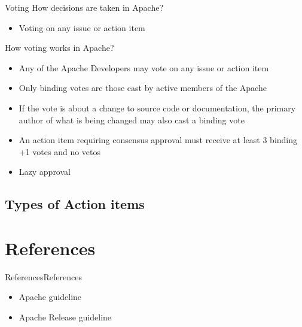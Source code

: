 \documentclass[10pt]{beamer}
\begin{document}
\begin{frame}{Voting}
  How decisions are taken in Apache? \pause
  \begin{itemize}
    \item Voting on any issue or action item
  \end{itemize}

  How voting works in Apache? \pause
  \begin{itemize}
    \item Any of the Apache Developers may vote on any issue or action
          item \pause
    \item Only binding votes are those cast by active members of the
          Apache \pause
    \item If the vote is about a change to source code or documentation,
          the primary author of what is being changed may also cast a binding
          vote \pause
    \item An action item requiring consensus approval must receive at least 3
          binding +1 votes and no vetos \pause
    \item Lazy approval
  \end{itemize}
\end{frame}

\subsection{Types of Action items}

\section{References}

\begin{frame}{References}{References}
  \begin{itemize}
    \item Apache guideline
    \item Apache Release guideline
  \end{itemize}
\end{frame}
\end{document}
